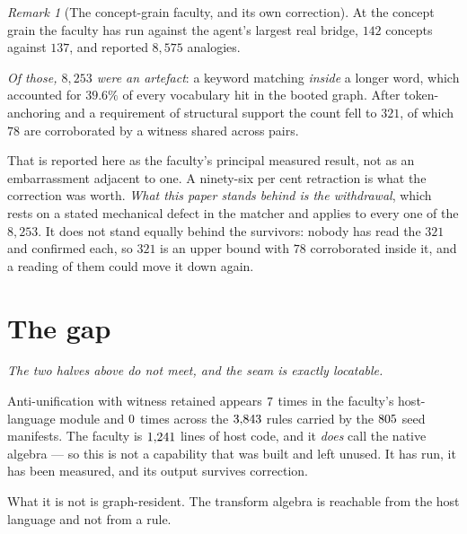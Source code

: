 \documentclass[11pt,a4paper]{article}
\theoremstyle{remark}
\newtheorem{remark}[definition]{Remark}
\begin{document}
\begin{remark}[The concept-grain faculty, and its own correction]\label{rem:retraction}
At the concept grain the faculty has run against the agent's largest real bridge, $142$ concepts against
$137$, and reported $8{,}575$ analogies.

\emph{Of those, $8{,}253$ were an artefact}: a keyword matching \emph{inside} a longer word, which
accounted for $39.6\%$ of every vocabulary hit in the booted graph. After token-anchoring and a
requirement of structural support the count fell to $321$, of which $78$ are corroborated by a witness
shared across pairs.

That is reported here as the faculty's principal measured result, not as an embarrassment adjacent to
one. A ninety-six per cent retraction is what the correction was worth. \emph{What this paper stands
behind is the withdrawal}, which rests on a stated mechanical defect in the matcher and applies to
every one of the $8{,}253$. It does not stand equally behind the survivors: nobody has read the $321$
and confirmed each, so $321$ is an upper bound with $78$ corroborated inside it, and a reading of them
could move it down again.
\end{remark}

\section{The gap}\label{sec:gap}
\emph{The two halves above do not meet, and the seam is exactly locatable.}

Anti-unification with witness retained appears $7$ times in the faculty's
host-language module and $0$ times across the $3{,}843$ rules carried by the
$805$ seed manifests. The faculty is $1{,}241$ lines of host code, and it \emph{does}
call the native algebra --- so this is not a capability that was built and left unused. It has run, it
has been measured, and its output survives correction.

What it is not is graph-resident. The transform algebra is reachable from the host language and not from
a rule.
\end{document}
